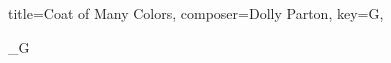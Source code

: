 \documentclass{article}
\begin{document}

\newlength{\chordwidth}

\begin{song}{
    title={Coat of Many Colors},
    composer={Dolly Parton},
    key={G},
}

\setlength{\chordwidth}{3mm}


\begin{intro}
    _{G}
\end{intro}

\begin{verse}
\end{verse}

\begin{verse}
\end{verse}

\begin{interlude}
\end{interlude}

\begin{verse}
\end{verse}

\begin{verse}
\end{verse}

\end{song}
\end{document}
